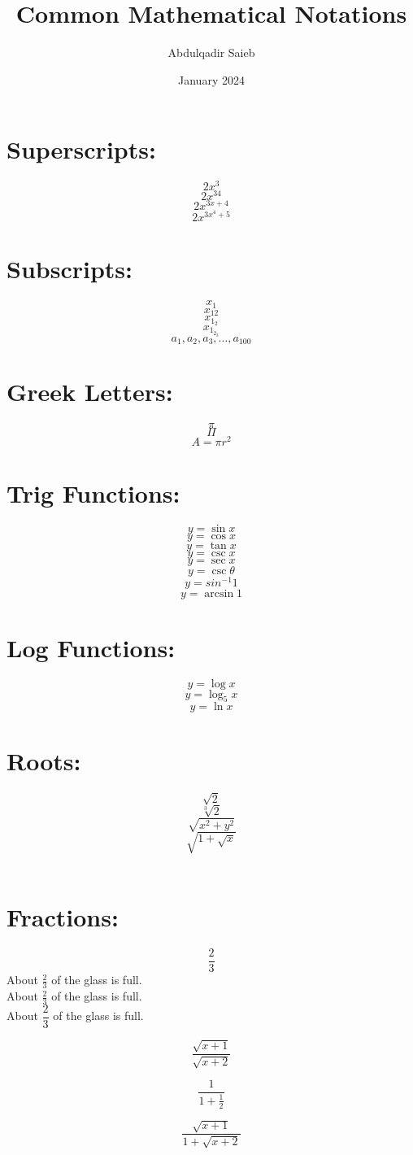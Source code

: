 \documentclass[11pt]{article}
\title{Common Mathematical Notations}
\author{Abdulqadir Saieb}
\date{January 2024}
\begin{document}
\maketitle

\thispagestyle{empty}

\section{Superscripts:}
$$2x^3$$ 
$$2x^{34}$$ 
$$2x^{3x+4}$$ 
$$2x^{3x^4+5}$$

\section{Subscripts:}
$$x_1$$ $$x_{12}$$
$$x_{1_2}$$
$$x_{1_{2_3}}$$
$$a_1, a_2, a_3, \ldots, a_{100}$$

\section{Greek Letters:}
$$\pi$$
$$\Pi$$
$$A=\pi r^2$$

\section{Trig Functions:}
$$y=\sin x$$
$$y=\cos x$$
$$y=\tan x$$
$$y=\csc x$$
$$y=\sec x$$
$$y=\csc\theta$$
$$y=sin^{-1} 1$$
$$y=\arcsin 1$$

\section{Log Functions:}
$$y=\log x$$
$$y=\log_5 x$$
$$y=\ln x$$

\section{Roots:}
$$\sqrt{2}$$
$$\sqrt[3]{2}$$
$$\sqrt{x^2+y^2}$$
$$\sqrt{1+\sqrt{x}}$$\\

\section{Fractions:}
$$\frac{2}{3}$$
About $\frac{2}{3}$ of the glass is full.\\[6pt]
About $\displaystyle\frac{2}{3}$ of the glass is full.\\[6pt]
About $\dfrac{2}{3}$ of the glass is full.

$$\frac{\sqrt{x+1}}{\sqrt{x+2}}$$

$$\frac{1}{1+\frac{1}{2}}$$

$$\frac{\sqrt{x+1}}{1+\sqrt{x+2}}$$
\end{document}
